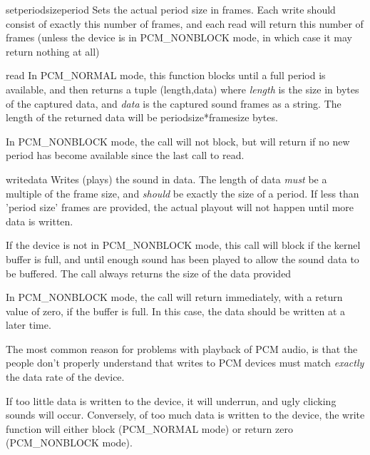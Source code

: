 \begin{methoddesc}[PCM]{setperiodsize}{period}
  Sets the actual period size in frames. Each write should consist of
  exactly this number of frames, and each read will return this number
  of frames (unless the device is in PCM_NONBLOCK mode, in which case
  it may return nothing at all)
\end{methoddesc}

\begin{methoddesc}[PCM]{read}{}
  In PCM_NORMAL mode, this function blocks until a full period is
  available, and then returns a tuple (length,data) where
  \emph{length} is the size in bytes of the captured data, and
  \emph{data} is the captured sound frames as a string. The length of
  the returned data will be periodsize*framesize bytes.

  In PCM_NONBLOCK mode, the call will not block, but will return
   if no new period has become available since the last
  call to read.
\end{methoddesc}

\begin{methoddesc}[PCM]{write}{data}
  Writes (plays) the sound in data. The length of data \emph{must} be
  a multiple of the frame size, and \emph{should} be exactly the size
  of a period. If less than 'period size' frames are provided, the
  actual playout will not happen until more data is written.

  If the device is not in PCM_NONBLOCK mode, this call will block if
  the kernel buffer is full, and until enough sound has been played to
  allow the sound data to be buffered. The call always returns the
  size of the data provided

  In PCM_NONBLOCK mode, the call will return immediately, with a
  return value of zero, if the buffer is full. In this case, the data
  should be written at a later time.

\end{methoddesc}


The most common reason for problems with playback of PCM audio, is
that the people don't properly understand that writes to PCM devices
must match \emph{exactly} the data rate of the device.

If too little data is written to the device, it will underrun, and
ugly clicking sounds will occur. Conversely, of too much data is
written to the device, the write function will either block
(PCM_NORMAL mode) or return zero (PCM_NONBLOCK mode).

